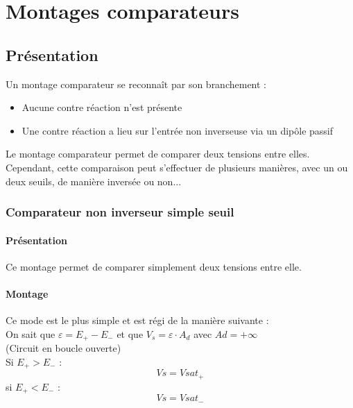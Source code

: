 

\chapter{Montages comparateurs}
\section{Présentation}

Un montage comparateur se reconnaît par son branchement : 

\begin{itemize}
  \item {\color{red}Aucune contre réaction} n’est présente
  \item Une {\color{red} contre réaction a lieu sur l’entrée non inverseuse} via un dipôle passif
\end{itemize}

Le montage comparateur permet de comparer deux tensions entre elles. \\
Cependant, cette comparaison peut s’effectuer de plusieurs manières, avec un ou deux seuils, de manière inversée ou non...

\subsection{Comparateur non inverseur simple seuil}

\subsubsection{Présentation}

Ce montage permet de comparer simplement deux tensions entre elle.

\subsubsection{Montage}


Ce mode est le plus simple et est régi de la manière suivante : \\

On sait que $\varepsilon = E_+ - E_-$ et que $V_s=\varepsilon \cdot A_d$ avec $Ad=+\infty$ \\
(Circuit en boucle ouverte) \\


Si $E_+>E_-$ :
$$Vs=Vsat_+$$ 
 si $E_+<E_-$ :
$$Vs=Vsat_-$$

